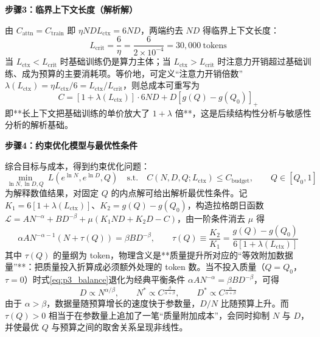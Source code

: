 \textbf{步骤3：临界上下文长度（解析解）}

由 $C_{\text{attn}}=C_{\text{train}}$ 即 $\eta N D L_{\text{ctx}}=6ND$，两端约去 $ND$ 得临界上下文长度：
\begin{equation}
    L_{\text{crit}} = \frac{6}{\eta} = \frac{6}{2\times10^{-4}} = 30{,}000\ \text{tokens}
\end{equation}
当 $L_{\text{ctx}}<L_{\text{crit}}$ 时基础训练仍是算力主体；当 $L_{\text{ctx}}>L_{\text{crit}}$ 时注意力开销超过基础训练、成为预算的主要消耗项。等价地，可定义“注意力开销倍数”$\lambda(L_{\text{ctx}})=\eta L_{\text{ctx}}/6=L_{\text{ctx}}/L_{\text{crit}}$，则总成本可重写为
\begin{equation}
    C=\left[1+\lambda(L_{\text{ctx}})\right]\cdot 6ND + D\left[g(Q)-g(Q_0)\right]_{+}
\end{equation}
即**长上下文把基础训练的单价放大了 $1+\lambda$ 倍**，这是后续结构性分析与敏感性分析的解析基础。

\textbf{步骤4：约束优化模型与最优性条件}

综合目标与成本，得到约束优化问题：
\begin{equation}
    \min_{\ln N,\ln D,Q}\ L(e^{\ln N},e^{\ln D},Q)
    \quad\text{s.t.}\quad
    C(N,D,Q;L_{\text{ctx}})\le C_{\text{budget}},\qquad Q\in[Q_0,1]
\end{equation}
为解释数值结果，对固定 $Q$ 的内点解可给出解析最优性条件。记 $K_1=6[1+\lambda(L_{\text{ctx}})]$、$K_2=g(Q)-g(Q_0)$，构造拉格朗日函数 $\mathcal L=A N^{-\alpha}+B D^{-\beta}+\mu(K_1ND+K_2D-C)$，由一阶条件消去 $\mu$ 得
\begin{equation}
    \alpha A N^{-\alpha-1}\left(N+\tau(Q)\right)=\beta B D^{-\beta},
    \qquad \tau(Q)\equiv\frac{K_2}{K_1}=\frac{g(Q)-g(Q_0)}{6\left[1+\lambda(L_{\text{ctx}})\right]}
    \label{eq:p3_balance}
\end{equation}
其中 $\tau(Q)$ 的量纲为 token，物理含义是**质量提升所对应的“等效附加数据量”**：把质量投入折算成必须额外处理的 token 数。当不投入质量（$Q=Q_0$，$\tau=0$）时式\eqref{eq:p3_balance}退化为经典平衡条件 $\alpha A N^{-\alpha}=\beta B D^{-\beta}$，可得
\begin{equation}
    D \propto N^{\alpha/\beta},\qquad
    N^{*}\propto C^{\frac{\beta}{\alpha+\beta}},\qquad
    D^{*}\propto C^{\frac{\alpha}{\alpha+\beta}}
\end{equation}
由于 $\alpha>\beta$，数据量随预算增长的速度快于参数量，$D/N$ 比随预算上升。而 $\tau(Q)>0$ 相当于在参数量上追加了一笔“质量附加成本”，会同时抑制 $N$ 与 $D$，并使最优 $Q$ 与预算之间的取舍关系呈现非线性。

